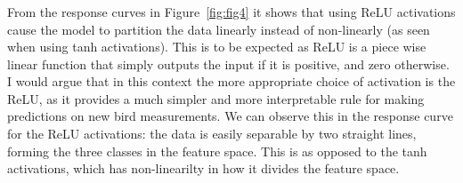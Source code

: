 \documentclass[12pt]{article}
\begin{document}
\subsubsection{}
From the response curves in Figure~\ref{fig:fig4} it shows that using ReLU activations cause the model to partition the data linearly instead of non-linearly (as seen when using tanh activations). This is to be expected as ReLU is a piece wise linear function that simply outputs the input if it is positive, and zero otherwise. I would argue that in this context the more appropriate choice of activation is the ReLU, as it provides a much simpler and more interpretable rule for making predictions on new bird measurements. We can observe this in the response curve for the ReLU activations: the data is easily separable by two straight lines, forming the three classes in the feature space. This is as opposed to the tanh activations, which has non-linearilty in how it divides the feature space.


\newpage
\appendix
\end{document}

